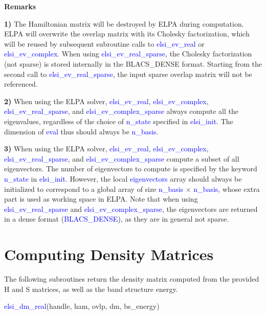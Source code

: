 \documentclass{report}
\begin{document}
\textbf{Remarks}

\textbf{1)} The Hamiltonian matrix will be destroyed by ELPA during computation.  ELPA will overwrite the overlap matrix with its Cholesky factorization, which will be reused by subsequent subroutine calls to \textcolor{blue}{elsi\_ev\_real} or \textcolor{blue}{elsi\_ev\_complex}.  When using \textcolor{blue}{elsi\_ev\_real\_sparse}, the Cholesky factorization (not sparse) is stored internally in the BLACS\_DENSE format.  Starting from the second call to \textcolor{blue}{elsi\_ev\_real\_sparse}, the input sparse overlap matrix will not be referenced.

\textbf{2)} When using the ELPA solver, \textcolor{blue}{elsi\_ev\_real}, \textcolor{blue}{elsi\_ev\_complex}, \textcolor{blue}{elsi\_ev\_real\_sparse}, and \textcolor{blue}{elsi\_ev\_complex\_sparse} always compute all the eigenvalues, regardless of the choice of \textcolor{blue}{n\_state} specified in \textcolor{blue}{elsi\_init}.  The dimension of \textcolor{blue}{eval} thus should always be \textcolor{blue}{n\_basis}.

\textbf{3)} When using the ELPA solver, \textcolor{blue}{elsi\_ev\_real}, \textcolor{blue}{elsi\_ev\_complex}, \textcolor{blue}{elsi\_ev\_real\_sparse}, and \textcolor{blue}{elsi\_ev\_complex\_sparse} compute a subset of all eigenvectors.  The number of eigenvectors to compute is specified by the keyword \textcolor{blue}{n\_state} in \textcolor{blue}{elsi\_init}.  However, the local \textcolor{blue}{eigenvectors} array should always be initialized to correspond to a global array of size \textcolor{blue}{n\_basis} $\times$ \textcolor{blue}{n\_basis}, whose extra part is used as working space in ELPA.  Note that when using \textcolor{blue}{elsi\_ev\_real\_sparse} and \textcolor{blue}{elsi\_ev\_complex\_sparse}, the eigenvectors are returned in a dense format (\textcolor{blue}{BLACS\_DENSE}), as they are in general not sparse.

\section{Computing Density Matrices}
\label{sec:dm}
The following subroutines return the density matrix computed from the provided H and S matrices, as well as the band structure energy.
\begin{labeling}{\hspace{6cm}}
\item [\hspace{0.3cm} \textcolor{blue}{elsi\_dm\_real}(handle, ham, ovlp, dm, bs\_energy)]
\end{labeling}
\end{document}
